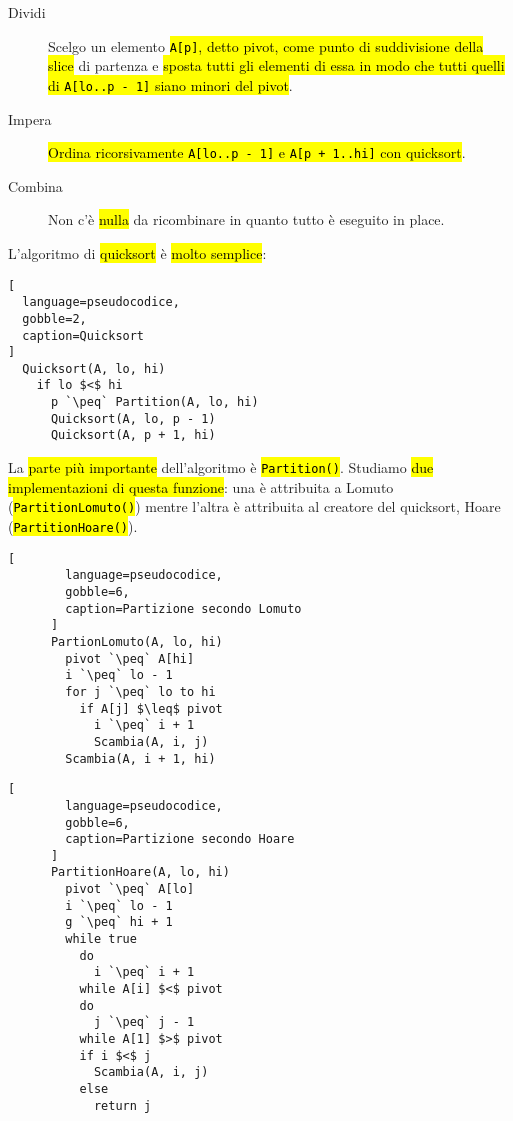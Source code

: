 \documentclass[a4paper,11pt,twoside]{article}
\theoremstyle{plain}
\theoremstyle{definition}
\theoremstyle{remark}
\newcommand{\peq}{$\gets$}
\begin{document}
\begin{description}
  \item[Dividi] Scelgo un elemento \hl{\texttt{A[p]}, detto pivot, come punto di
    suddivisione della slice} di partenza e \hl{sposta tutti gli elementi di
    essa in modo che tutti quelli di \texttt{A[lo..p - 1]} siano minori del
    pivot}.
  \item[Impera] \hl{Ordina ricorsivamente \texttt{A[lo..p - 1]} e
    \texttt{A[p + 1..hi]} con quicksort}.
  \item[Combina] Non c'è \hl{nulla} da ricombinare in quanto tutto è eseguito in
    place.
\end{description}

L'algoritmo di \hl{quicksort} è \hl{molto semplice}:

\begin{lstlisting}[
  language=pseudocodice,
  gobble=2,
  caption=Quicksort
]
  Quicksort(A, lo, hi)
    if lo $<$ hi
      p `\peq` Partition(A, lo, hi)
      Quicksort(A, lo, p - 1)
      Quicksort(A, p + 1, hi)
\end{lstlisting}

La \hl{parte più importante} dell'algoritmo è \hl{\texttt{Partition()}}.
Studiamo \hl{due implementazioni di questa funzione}: una è attribuita a Lomuto
(\hl{\texttt{PartitionLomuto()}}) mentre l'altra è attribuita al creatore del
quicksort, Hoare (\hl{\texttt{PartitionHoare()}}).

\noindent\begin{minipage}{\textwidth}
  \centering
  \begin{minipage}{0.45\textwidth}
    \centering
    \begin{lstlisting}[
        language=pseudocodice,
        gobble=6,
        caption=Partizione secondo Lomuto
      ]
      PartionLomuto(A, lo, hi)
        pivot `\peq` A[hi]
        i `\peq` lo - 1
        for j `\peq` lo to hi
          if A[j] $\leq$ pivot
            i `\peq` i + 1
            Scambia(A, i, j)
        Scambia(A, i + 1, hi)
    \end{lstlisting}
  \end{minipage}
  \begin{minipage}{0.45\textwidth}
    \centering
    \begin{lstlisting}[
        language=pseudocodice,
        gobble=6,
        caption=Partizione secondo Hoare
      ]
      PartitionHoare(A, lo, hi)
        pivot `\peq` A[lo]
        i `\peq` lo - 1
        g `\peq` hi + 1
        while true
          do
            i `\peq` i + 1
          while A[i] $<$ pivot
          do
            j `\peq` j - 1
          while A[1] $>$ pivot
          if i $<$ j
            Scambia(A, i, j)
          else
            return j
    \end{lstlisting}
  \end{minipage}
\end{minipage}
\end{document}
